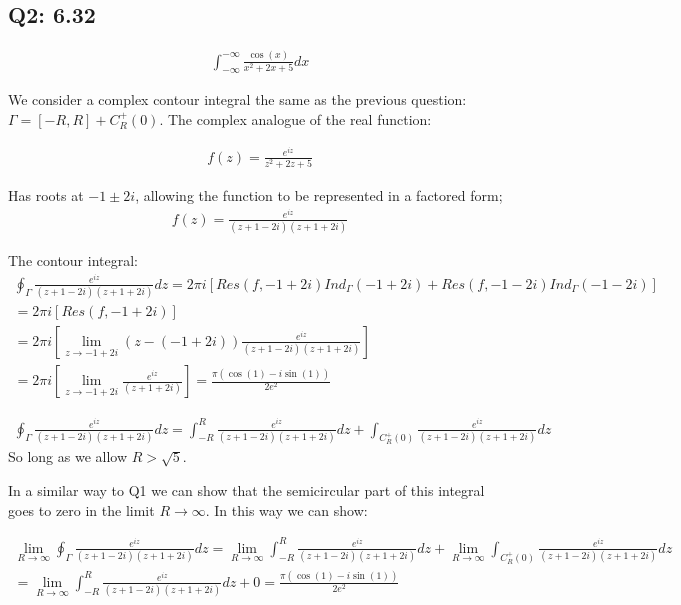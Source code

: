 \documentclass{article}
\begin{document}
			
	
		\subsection{Q2: 6.32}
			
			\begin{gather}
				\int_{-\infty}^{-\infty}\frac{\cos(x)}{x^2+2x+5}dx
			\end{gather}
			
			We consider a complex contour integral the same as the previous question: $\Gamma = [-R,R] + C^{+}_{R}(0)$. 
			The complex analogue of the real function:
			
			\begin{gather}
				f(z) = \frac{e^{iz}}{z^2+2z+5}
			\end{gather}
			
			Has roots at $-1\pm 2i$, allowing the function to be represented in a factored form;
			\begin{gather}
				f(z) = \frac{e^{iz}}{(z+1-2i)(z+1+2i)}
			\end{gather}
			
			The contour integral:
			\begin{gather}
				\oint_{\Gamma}\frac{e^{iz}}{(z+1-2i)(z+1+2i)}dz = 2\pi i [Res(f,-1+2i)Ind_\Gamma(-1+2i)+Res(f,-1-2i)Ind_\Gamma(-1-2i)]\\
				= 2\pi i [Res(f,-1+2i)]\\
				= 2\pi i [\lim_{z\to -1+2i}(z-(-1+2i))\frac{e^{iz}}{(z+1-2i)(z+1+2i)}]\\
				= 2\pi i [\lim_{z\to -1+2i}\frac{e^{iz}}{(z+1+2i)}] = \frac{\pi(\cos(1)-i\sin(1))}{2e^2}
			\end{gather}
			
			\begin{gather}
				\oint_{\Gamma}\frac{e^{iz}}{(z+1-2i)(z+1+2i)}dz = \int_{-R}^{R}\frac{e^{iz}}{(z+1-2i)(z+1+2i)}dz + \int_{C^{+}_{R}(0)}\frac{e^{iz}}{(z+1-2i)(z+1+2i)}dz
			\end{gather}
			So long as we allow $R>\sqrt{5}$.
			
			In a similar way to Q1 we can show that the semicircular part of this integral goes to zero in the limit $R \to \infty$. In this way we can show:
			
			\begin{gather}
			\lim_{R\to\infty}	\oint_{\Gamma}\frac{e^{iz}}{(z+1-2i)(z+1+2i)}dz = \lim_{R\to\infty}\int_{-R}^{R}\frac{e^{iz}}{(z+1-2i)(z+1+2i)}dz + \lim_{R\to\infty}\int_{C^{+}_{R}(0)}\frac{e^{iz}}{(z+1-2i)(z+1+2i)}dz\\
			= \lim_{R\to\infty}\int_{-R}^{R}\frac{e^{iz}}{(z+1-2i)(z+1+2i)}dz + 0 = \frac{\pi(\cos(1)-i\sin(1))}{2e^2}
			\end{gather}
			
\end{document}

